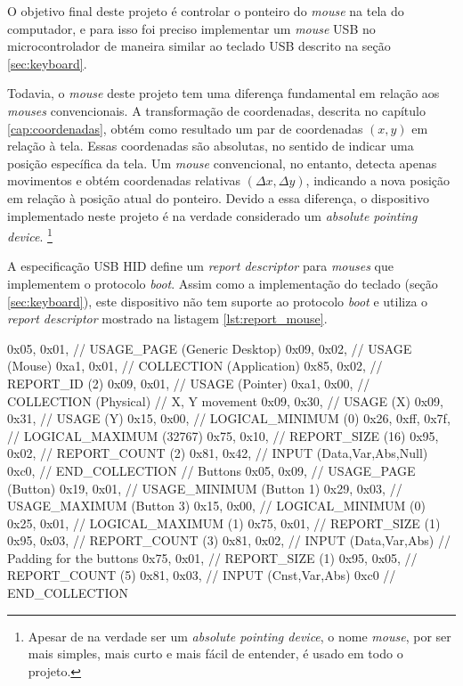 \documentclass[brazil,pagestart=firstchapter]{abnt}
\begin{document}
O objetivo final deste projeto é controlar o ponteiro do \textit{mouse} na
tela do computador, e para isso foi preciso implementar um \textit{mouse}
USB no microcontrolador de maneira similar ao teclado USB descrito na seção
\ref{sec:keyboard}.

Todavia, o \textit{mouse} deste projeto tem uma diferença fundamental em
relação aos \textit{mouses} convencionais. A transformação de coordenadas,
descrita no capítulo \ref{cap:coordenadas}, obtém como resultado um par de
coordenadas $(x, y)$ em relação à tela. Essas coordenadas são absolutas, no
sentido de indicar uma posição específica da tela. Um \textit{mouse}
convencional, no entanto, detecta apenas movimentos e obtém coordenadas
relativas $(\Delta x, \Delta y)$, indicando a nova posição em relação à
posição atual do ponteiro. Devido a essa diferença, o dispositivo
implementado neste projeto é na verdade considerado um \textit{absolute
pointing device}. \footnote{
	Apesar de na verdade ser um \textit{absolute pointing device}, o nome
	\textit{mouse}, por ser mais simples, mais curto e mais fácil de
	entender, é usado em todo o projeto.
}

A especificação \ac{USB} \ac{HID} define um \textit{report descriptor} para
\textit{mouses} que implementem o protocolo \textit{boot}.
\cite[p.~61]{usbhid} Assim como a implementação do teclado (seção
\ref{sec:keyboard}), este dispositivo não tem suporte ao protocolo
\textit{boot} e utiliza o \textit{report descriptor} mostrado na listagem
\ref{lst:report_mouse}.

\begin{ccode}[numbers=none, float=h, label={lst:report_mouse},
	caption={\textit{Report descriptor} do \textit{mouse} USB}
]
	0x05, 0x01,        // USAGE_PAGE (Generic Desktop)
	0x09, 0x02,        // USAGE (Mouse)
	0xa1, 0x01,        // COLLECTION (Application)
	0x85, 0x02,	       //   REPORT_ID (2)
	0x09, 0x01,        //   USAGE (Pointer)
	0xa1, 0x00,        //   COLLECTION (Physical)
	// X, Y movement
	0x09, 0x30,        //     USAGE (X)
	0x09, 0x31,        //     USAGE (Y)
	0x15, 0x00,        //     LOGICAL_MINIMUM (0)
	0x26, 0xff, 0x7f,  //     LOGICAL_MAXIMUM (32767)
	0x75, 0x10,        //     REPORT_SIZE (16)
	0x95, 0x02,        //     REPORT_COUNT (2)
	0x81, 0x42,        //     INPUT (Data,Var,Abs,Null)
	0xc0,              //   END_COLLECTION
	// Buttons
	0x05, 0x09,        //   USAGE_PAGE (Button)
	0x19, 0x01,        //   USAGE_MINIMUM (Button 1)
	0x29, 0x03,        //   USAGE_MAXIMUM (Button 3)
	0x15, 0x00,        //   LOGICAL_MINIMUM (0)
	0x25, 0x01,        //   LOGICAL_MAXIMUM (1)
	0x75, 0x01,        //   REPORT_SIZE (1)
	0x95, 0x03,        //   REPORT_COUNT (3)
	0x81, 0x02,        //   INPUT (Data,Var,Abs)
	// Padding for the buttons
	0x75, 0x01,        //   REPORT_SIZE (1)
	0x95, 0x05,        //   REPORT_COUNT (5)
	0x81, 0x03,        //   INPUT (Cnst,Var,Abs)
	0xc0               // END_COLLECTION
\end{ccode}
\end{document}
